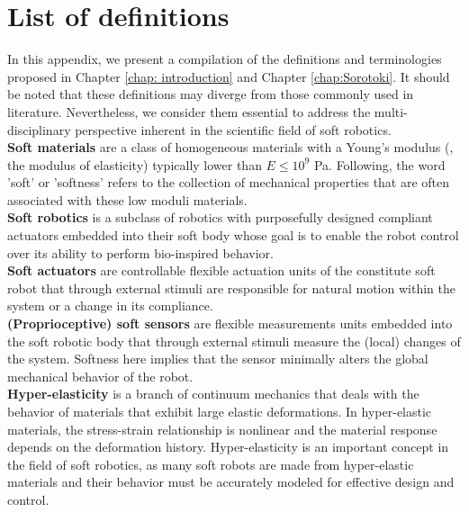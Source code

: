 \chapter{List of definitions}
In this appendix, we present a compilation of the definitions and terminologies proposed in Chapter \ref{chap: introduction} and Chapter \ref{chap:Sorotoki}. It should be noted that these definitions may diverge from those commonly used in literature. Nevertheless, we consider them essential to address the multi-disciplinary perspective inherent in the scientific field of soft robotics. \\

\noindent \textbf{Soft materials} are a class of homogeneous materials with a Young's modulus (\ie, the modulus of elasticity) typically lower than $E \le 10^9$ \si{\pascal}. Following, the word 'soft' or 'softness' refers to the collection of mechanical properties that are often associated with these low moduli materials. \\

%
\noindent \textbf{Soft robotics} is a subclass of robotics with purposefully designed compliant actuators embedded into their soft body whose goal is to enable the robot control over its ability to perform bio-inspired behavior. \\

\noindent \textbf{Soft actuators} are controllable flexible actuation units of the constitute soft robot that through external stimuli are responsible for natural motion within the system or a change in its compliance. \\

\noindent \textbf{(Proprioceptive) soft sensors} are flexible measurements units embedded into the soft robotic body that through external stimuli measure the (local) changes of the system. Softness here implies that the sensor minimally alters the global mechanical behavior of the robot. \\

\noindent \textbf{Hyper-elasticity} is a branch of continuum mechanics that deals with the behavior of materials that exhibit large elastic deformations. In hyper-elastic materials, the stress-strain relationship is nonlinear and the material response depends on the deformation history. Hyper-elasticity is an important concept in the field of soft robotics, as many soft robots are made from hyper-elastic materials and their behavior must be accurately modeled for effective design and control.  \\


